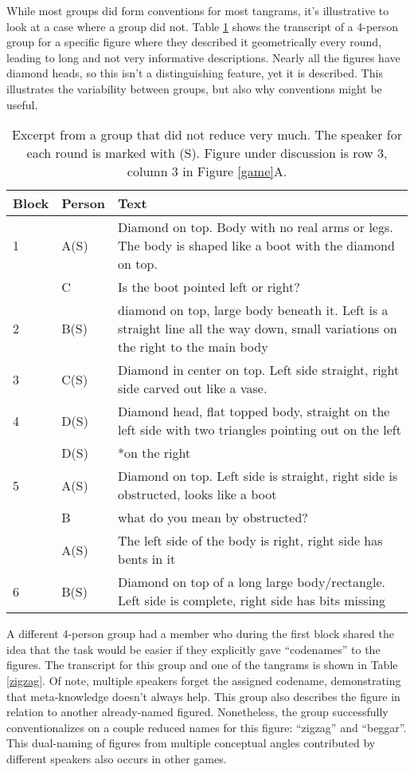 \documentclass[
  english,
  a4paper,
]{article}
\begin{document}
While most groups did form conventions for most tangrams, it's illustrative to look at a case where a group did not. Table \ref{diamond} shows the transcript of a 4-person group for a specific figure where they described it geometrically every round, leading to long and not very informative descriptions. Nearly all the figures have diamond heads, so this isn't a distinguishing feature, yet it is described. This illustrates the variability between groups, but also why conventions might be useful.

\begin{table}[H]

\caption{\label{tab:diamond}Excerpt from a group that did not reduce very much. The speaker for each round is marked with (S). Figure under discussion is row 3, column 3 in Figure \ref{game}A.\label{diamond}}
\centering
\begin{tabular}[t]{ll>{\raggedright\arraybackslash}p{16em}}
\toprule
Block & Person & Text\\
\midrule
1 & A(S) & Diamond on top. Body with no real arms or legs. The body is shaped like a boot with the diamond on top.\\
 & C & Is the boot pointed left or right?\\
2 & B(S) & diamond on top, large body beneath it. Left is a straight line all the way down, small variations on the right to the main body\\
3 & C(S) & Diamond in center on top. Left side straight, right side carved out like a vase.\\
4 & D(S) & Diamond head, flat topped body, straight on the left side with two triangles pointing out on the left\\
 & D(S) & *on the right\\
5 & A(S) & Diamond on top. Left side is straight, right side is obstructed, looks like a boot\\
 & B & what do you mean by obstructed?\\
 & A(S) & The left side of the body is right, right side has bents in it\\
6 & B(S) & Diamond on top of a long large body/rectangle. Left side is complete, right side has bits missing\\
\bottomrule
\end{tabular}
\end{table}

A different 4-person group had a member who during the first block shared the idea that the task would be easier if they explicitly gave ``codenames'' to the figures. The transcript for this group and one of the tangrams is shown in Table \ref{zigzag}. Of note, multiple speakers forget the assigned codename, demonstrating that meta-knowledge doesn't always help. This group also describes the figure in relation to another already-named figured. Nonetheless, the group successfully conventionalizes on a couple reduced names for this figure: ``zigzag'' and ``beggar''. This dual-naming of figures from multiple conceptual angles contributed by different speakers also occurs in other games.
\end{document}

